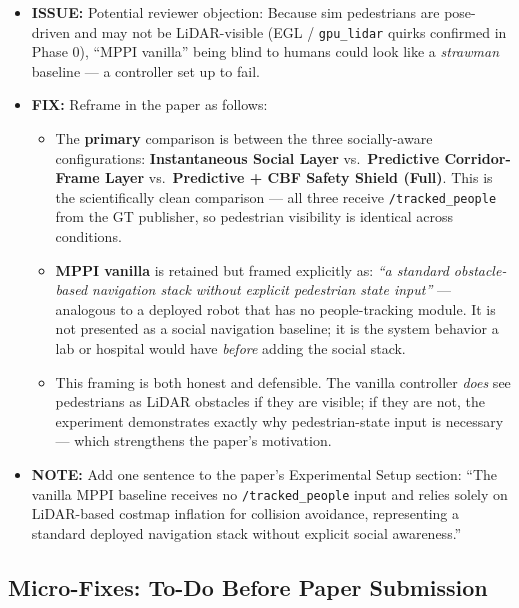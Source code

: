 \documentclass[11pt]{article}
\newcommand{\issue}[1]{\textcolor{issuered}{\textbf{ISSUE:} #1}}
\newcommand{\fix}[1]{\textcolor{fixgreen}{\textbf{FIX:} #1}}
\newcommand{\note}[1]{\textcolor{notblue}{\textbf{NOTE:} #1}}
\begin{document}
\begin{itemize}
  \item \issue{Potential reviewer objection}: Because sim pedestrians are pose-driven
    and may not be LiDAR-visible (EGL / \texttt{gpu\_lidar} quirks confirmed in Phase 0),
    ``MPPI vanilla'' being blind to humans could look like a \emph{strawman} baseline ---
    a controller set up to fail.

  \item \fix{Reframe in the paper as follows:}
    \begin{itemize}
      \item The \textbf{primary} comparison is between the three socially-aware
        configurations: \textbf{Instantaneous Social Layer} vs.\
        \textbf{Predictive Corridor-Frame Layer} vs.\
        \textbf{Predictive + CBF Safety Shield (Full)}.
        This is the scientifically clean comparison --- all three receive
        \texttt{/tracked\_people} from the GT publisher, so pedestrian visibility
        is identical across conditions.
      \item \textbf{MPPI vanilla} is retained but framed explicitly as:
        \emph{``a standard obstacle-based navigation stack without explicit
        pedestrian state input''} --- analogous to a deployed robot that has no
        people-tracking module. It is not presented as a social navigation baseline;
        it is the system behavior a lab or hospital would have \emph{before} adding
        the social stack.
      \item This framing is both honest and defensible. The vanilla controller
        \emph{does} see pedestrians as LiDAR obstacles if they are visible; if they
        are not, the experiment demonstrates exactly why pedestrian-state input is
        necessary --- which strengthens the paper's motivation.
    \end{itemize}

  \item \note{Add one sentence to the paper's Experimental Setup section:
    ``The vanilla MPPI baseline receives no \texttt{/tracked\_people} input and
    relies solely on LiDAR-based costmap inflation for collision avoidance,
    representing a standard deployed navigation stack without explicit social
    awareness.''}
\end{itemize}

\subsection*{Micro-Fixes: To-Do Before Paper Submission}
\end{document}
